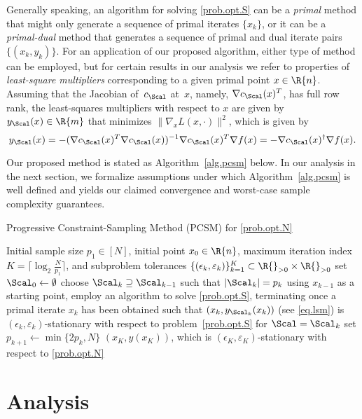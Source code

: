 Generally speaking, an algorithm for solving \eqref{prob.opt.S} can be a \emph{primal} method that might only generate a sequence of primal iterates $\{x_k\}$, or it can be a \emph{primal-dual} method that generates a sequence of primal and dual iterate pairs $\{(x_k,y_k)\}$.  For an application of our proposed algorithm, either type of method can be employed, but for certain results in our analysis we refer to properties of \emph{least-square multipliers} corresponding to a given primal point $x \in \R{n}$.  Assuming that the Jacobian of~$c_\Scal$ at~$x$, namely, $\nabla c_\Scal(x)^T$, has full row rank, the least-squares multipliers with respect to $x$ are given by $y_\Scal(x) \in \R{m}$ that minimizes $\|\nabla_x L(x,\cdot)\|^2$, which is given by
\begin{equation}\label{eq.lsm}
  y_\Scal(x) = - (\nabla c_\Scal(x)^T \nabla c_\Scal(x))^{-1} \nabla c_\Scal(x)^T \nabla f(x) = - \nabla c_\Scal(x)^\dag \nabla f(x).
\end{equation}

Our proposed method is stated as Algorithm~\ref{alg.pcsm} below.  In our analysis in the next section, we formalize assumptions under which Algorithm~\ref{alg.pcsm} is well defined and yields our claimed convergence and worst-case sample complexity guarantees.

\balgorithm
  \caption{Progressive Constraint-Sampling Method (PCSM) for \eqref{prob.opt.N}}
  \label{alg.pcsm}
  \balgorithmic[1]
    \Require Initial sample size $p_1 \in [N]$, initial point $x_0 \in \R{n}$, maximum iteration index $K = \lceil \log_2 \frac{N}{p_1} \rceil$, and subproblem tolerances $\{(\epsilon_k,\varepsilon_k)\}_{k=1}^K \subset \R{}_{>0} \times \R{}_{>0}$
    \State set $\Scal_0 \gets \emptyset$
      \State choose $\Scal_k \supseteq \Scal_{k-1}$ such that $|\Scal_k| = p_k$
      \State using $x_{k-1}$ as a starting point, employ an algorithm to solve \eqref{prob.opt.S}, terminating once a primal iterate $x_k$ has been obtained such that $(x_k,y_{\Scal_k}(x_k))$ (see \eqref{eq.lsm}) is $(\epsilon_k,\varepsilon_k)$-stationary with respect to problem~\eqref{prob.opt.S} for $\Scal = \Scal_k$
      \State set $p_{k+1} \gets \min\{2p_k, N\}$
    \EndFor
    \State \Return $(x_K,y(x_K))$, which is $(\epsilon_K,\varepsilon_K)$-stationary with respect to \eqref{prob.opt.N}
  \ealgorithmic
\ealgorithm

\section{Analysis}\label{sec.analysis}

